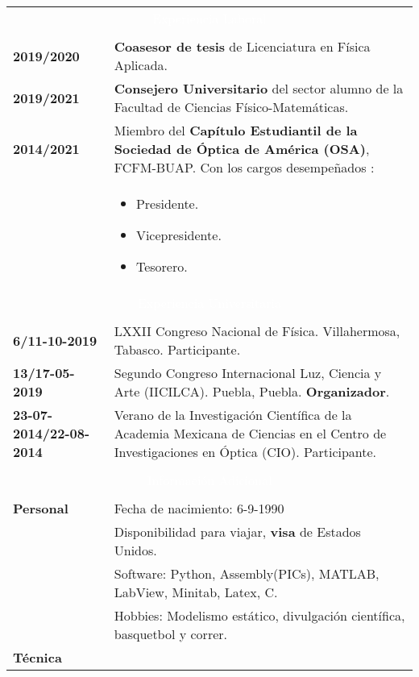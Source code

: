 \documentclass[twoside,letter,openright,10pt]{report}
\begin{document}
\begin{table}[hbt!]
\begin{tabular}{p{40mm}p{140mm}}
\multicolumn{2}{c}{\cellcolor{black} \textcolor{white}{Experiencia Laboral}}
\\
\\
\textbf{2019/2020} & \textbf{Coasesor de tesis} de Licenciatura en Física Aplicada.
\\
\textbf{2019/2021} & \textbf{Consejero Universitario} del sector alumno de la Facultad de Ciencias Físico-Matemáticas.
\\
\textbf{2014/2021} & Miembro del \textbf{Capítulo Estudiantil de la Sociedad de Óptica de América (OSA)}, FCFM-BUAP. Con los cargos desempeñados :\\
& \vspace{-2mm} \begin{itemize}[noitemsep,nolistsep]
\item Presidente.
\item Vicepresidente.
\item Tesorero.
\vspace{-4mm}
\end{itemize}
\\
\multicolumn{2}{c}{\cellcolor{black} \textcolor{white}{Experiencia Universitaria}}
\\
\\
\textbf{6/11-10-2019} &LXXII Congreso Nacional de Física. Villahermosa, Tabasco. Participante.
\\
\textbf{13/17-05-2019} &Segundo Congreso Internacional Luz, Ciencia y Arte (IICILCA). Puebla, Puebla. \textbf{Organizador}.
\\
\textbf{23-07-2014/22-08-2014} & Verano de la Investigación Científica de la Academia Mexicana de Ciencias en el Centro de Investigaciones en Óptica (CIO). Participante.
\\
\\
\multicolumn{2}{c}{\cellcolor{black} \textcolor{white}{Información Adicional}}
\\
\\
\textbf{Personal} &  Fecha de nacimiento: 6-9-1990
\\
& Disponibilidad para viajar, \textbf{visa} de Estados Unidos.
\\
& Software: Python, Assembly(PICs), MATLAB, LabView, Minitab, Latex, C.
\\
& Hobbies: Modelismo estático, divulgación científica, basquetbol y correr.
\\
\textbf{Técnica}

\end{tabular}
\end{table}
\end{document}
